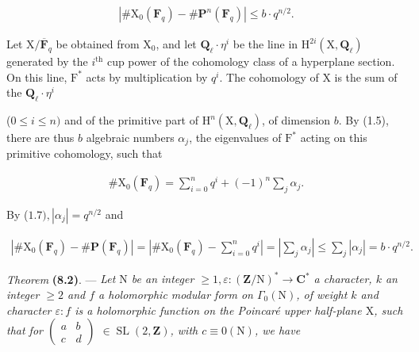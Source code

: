 \documentclass[10pt,leqno]{article}
\begin{document}
\begin{equation*}\begin{gathered}|\# \mathrm{X}_{0}(\mathbf{F}_{q})- \# \mathbf{P}^{n}(\mathbf{F}_{q})| \leq  b\cdot q^{n/2}.\end{gathered}\end{equation*}

\noindent Let \(\mathrm{X}/\overline{\mathbf{F}}_{q}\) be obtained from \(\mathrm{X}_{0}\), and let \(\mathbf{Q}_{\ell }\cdot \eta ^{i}\) be the line in \(\mathrm{H}^{2i}(\mathrm{X},\mathbf{Q}_{\ell })\) generated by the \(i^{\mathrm{th}}\) cup power of the cohomology class of a hyperplane section. On this line, \(\mathrm{F}^{*}\) acts by multiplication by \(q^{i}\). The cohomology of \(\mathrm{X}\) is the sum of the \(\mathbf{Q}_{\ell }\cdot \eta ^{i}\)\par

\clearpage

\label{physical-31}

\noindent (\(0 \leq  i \leq  n)\) and of the primitive part of \(\mathrm{H}^{n}(\mathrm{X}, \mathbf{Q}_{\ell })\), of dimension \(b\). By (1.5), there are thus \(b\) algebraic numbers \(\alpha _{j}\), the eigenvalues of \(\mathrm{F}^{*}\) acting on this primitive cohomology, such that\par

\begin{equation*}\begin{gathered}\# \mathrm{X}_{0}(\mathbf{F}_{q}) = \sum _{i=0}^{n} q^{i} + (-1)^{n} \sum _{j} \alpha _{j}.\end{gathered}\end{equation*}

\noindent By (\(1.7), |\alpha _{j}| = q^{n/2}\) and\par

\begin{equation*}\begin{gathered}|\# \mathrm{X}_{0}(\mathbf{F}_{q}) - \# \mathbf{P}(\mathbf{F}_{q})| = |\# \mathrm{X}_{0}(\mathbf{F}_{q}) - \sum _{i=0}^{n} q^{i}| = |\sum _{j} \alpha _{j}| \leq  \sum _{j} |\alpha _{j}| = b\cdot q^{n/2}.\end{gathered}\end{equation*}

\noindent \emph{Theorem} \textbf{(8.2)}. — {\itshape Let \(\mathrm{N}\) be an integer \(\geq  1, \varepsilon  : (\mathbf{Z}/\mathrm{N})^{*} \longrightarrow  \mathbf{C}^{*}\) a character, \(k\) an integer \(\geq  2\) and \(f\) a holomorphic modular form on \(\Gamma _{0}(\mathrm{N})\), of weight \(k\) and character \(\varepsilon  : f\) is a holomorphic function on the Poincaré upper half-plane \(\mathrm{X}\), such that for \(\begin{pmatrix}a&b\\c&d\end{pmatrix}\) \(\in  \operatorname{SL}(2, \mathbf{Z})\), with \(c \equiv  0 (\mathrm{N})\), we have}\par
\end{document}
